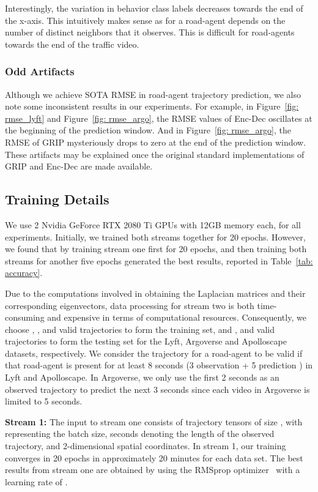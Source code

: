 \documentclass[10pt,twocolumn,letterpaper]{article}
\theoremstyle{plain}
\begin{document}
Interestingly, the variation in behavior class labels decreases towards the end of the x-axis. This intuitively makes sense as  for a road-agent depends on the number of distinct neighbors that it observes. This is difficult for road-agents towards the end of the traffic video.
\subsubsection{Odd Artifacts}
Although we achieve SOTA RMSE in road-agent trajectory prediction, we also note some inconsistent results in our experiments. For example, in Figure~\ref{fig: rmse_lyft} and Figure~\ref{fig: rmse_argo}, the RMSE values of Enc-Dec oscillates at the beginning of the prediction window. And in Figure~\ref{fig: rmse_argo}, the RMSE of GRIP mysteriously drops to zero at the end of the prediction window. These artifacts may be explained once the original standard implementations of GRIP and Enc-Dec are made available.



\subsection{Training Details}
\label{subsec: implementation}
We use 2 Nvidia GeForce RTX 2080 Ti GPUs with 12GB memory each, for all experiments. Initially, we trained both streams together for 20 epochs. However, we found that by training stream one first for 20 epochs, and then training both streams for another five epochs generated the best results, reported in Table~\ref{tab: accuracy}.

Due to the computations involved in obtaining the Laplacian matrices and their corresponding eigenvectors, data processing for stream two is both time-consuming and expensive in terms of computational resources. Consequently, we choose , , and  valid trajectories to form the training set, and ,  and  valid trajectories to form the testing set for the Lyft, Argoverse and Apolloscape datasets, respectively. We consider the trajectory for a road-agent to be valid if that road-agent is present for at least 8 seconds (3 observation + 5 prediction ) in Lyft and Apolloscape. In Argoverse, we only use the first 2 seconds as an observed trajectory to predict the next 3 seconds since each video in Argoverse is limited to 5 seconds. 





\textbf{Stream 1: }The input to stream one consists of trajectory tensors of size , with  representing the batch size,  seconds denoting the length of the observed trajectory, and 2-dimensional spatial coordinates. In stream 1, our training converges in 20 epochs in approximately 20 minutes for each data set. The best results from stream one are obtained by using the RMSprop optimizer~\cite{rmsprop} with a learning rate of .
\end{document}
